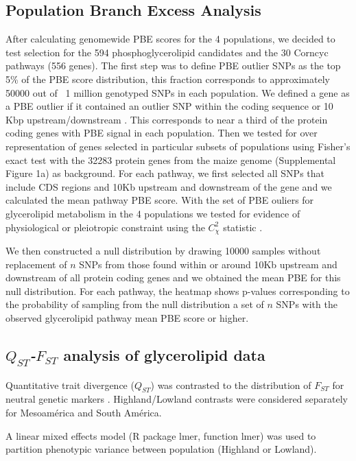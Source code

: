 \documentclass[9pt,twocolumn,twoside]{BioRxiv}
\begin{document}
\subsection{Population Branch Excess Analysis}
After calculating genomewide PBE scores for the 4 populations, we decided to test selection for the 594 phosphoglycerolipid candidates and the 30 Corncyc pathways (556 genes). 
The first step was to define PBE outlier SNPs as the top 5\% of the PBE score distribution, this fraction corresponds to approximately 50000 out of ~1 million genotyped SNPs in each population. 
We defined a gene as a PBE outlier if it contained an outlier SNP within the coding sequence or 10 Kbp upstream/downstream  \cite{Wang2020-mp}. 
This corresponds to near a third of the protein coding genes with PBE signal in each population. 
Then we tested for over representation of genes selected in particular subsets of populations using Fisher's exact test with the 32283 protein genes from the maize genome (Supplemental Figure 1a) \cite{wang2015a} as background. 
For each pathway, we first selected all SNPs that include CDS regions and 10Kb upstream and downstream of the gene and we calculated the mean pathway PBE score. 
With the set of PBE ouliers for glycerolipid metabolism in the 4 populations we tested for evidence of physiological or pleiotropic constraint using the $C_\chi^2$ statistic \cite{yeaman2018}. 

We then constructed a null distribution by drawing 10000 samples without replacement of $n$ SNPs from those found within or around 10Kb upstream and downstream of all protein coding genes and we obtained the mean PBE for this null distribution. 
For each pathway, the heatmap shows p-values corresponding to the probability of sampling from the null distribution a set of $n$ SNPs with the observed glycerolipid pathway mean PBE score or higher.



\subsection{\textit{$Q_{ST}$-$F_{ST}$} analysis of glycerolipid data}

Quantitative trait divergence ($Q_{ST}$) was contrasted to the distribution of $F_{ST}$ for neutral genetic markers \citep{whitlock2008evolutionary}.
Highland/Lowland contrasts were considered separately for Mesoamérica and South América.

A linear mixed effects model (R package lmer, function lmer) was used to partition phenotypic variance between population (Highland or Lowland).
\end{document}
